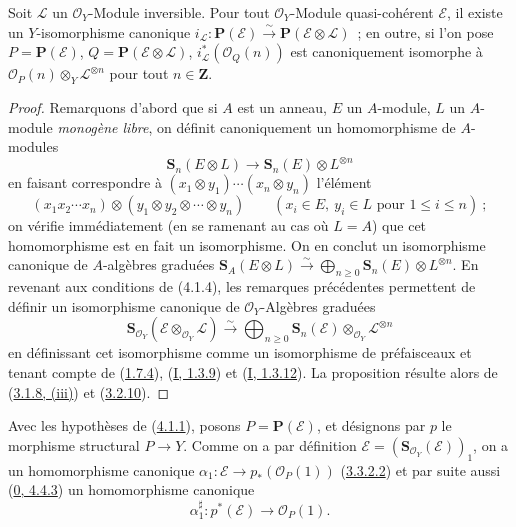 
\begin{proposition}[4.1.4]
\label{II.4.1.4-fr}
Soit $\mathcal{L}$ un $\mathcal{O}_Y$-Module inversible. Pour tout
$\mathcal{O}_Y$-Module quasi-cohérent $\mathcal{E}$, il existe un
$Y$-isomorphisme canonique
$i_{\mathcal{L}}:\mathbf{P}(\mathcal{E})\xrightarrow{\sim}
\mathbf{P}(\mathcal{E}\otimes\mathcal{L})$~; en outre, si l'on pose
$P=\mathbf{P}(\mathcal{E})$, $Q=\mathbf{P}(\mathcal{E}\otimes\mathcal{L})$,
$i_{\mathcal{L}}^*(\mathcal{O}_Q(n))$ est canoniquement isomorphe à
$\mathcal{O}_P(n)\otimes_Y\mathcal{L}^{\otimes n}$ pour tout
$n\in\mathbf{Z}$.
\end{proposition}

\begin{proof}
Remarquons d'abord que si $A$ est un anneau, $E$ un $A$-module, $L$ un
$A$-module \emph{monogène libre}, on définit canoniquement un homomorphisme
de $A$-modules
\[
  \mathbf{S}_n(E\otimes L)\longrightarrow
  \mathbf{S}_n(E)\otimes L^{\otimes n}
\]
en faisant correspondre à
$(x_1\otimes y_1)\cdots(x_n\otimes y_n)$ l'élément
\[
  (x_1x_2\cdots x_n)\otimes(y_1\otimes y_2\otimes\cdots\otimes y_n)
  \qquad(x_i\in E,\ y_i\in L\text{ pour }1\leq i\leq n)~;
\]
on vérifie immédiatement (en se ramenant au cas où $L=A$) que cet
homomorphisme est en fait un isomorphisme. On en conclut un isomorphisme
canonique de $A$-algèbres graduées
$\mathbf{S}_A(E\otimes L)\xrightarrow{\sim}
\bigoplus_{n\geq0}\mathbf{S}_n(E)\otimes L^{\otimes n}$. En revenant aux
conditions de (4.1.4), les remarques précédentes permettent de définir un
isomorphisme canonique de $\mathcal{O}_Y$-Algèbres graduées
\[
\label{II.4.1.4.1-fr}
  \mathbf{S}_{\mathcal{O}_Y}(\mathcal{E}\otimes_{\mathcal{O}_Y}\mathcal{L})
  \xrightarrow{\sim}
  \bigoplus_{n\geq0}\mathbf{S}_n(\mathcal{E})
  \otimes_{\mathcal{O}_Y}\mathcal{L}^{\otimes n}
\tag{4.1.4.1}
\]
en définissant cet isomorphisme comme un isomorphisme de préfaisceaux et
tenant compte de (\hyperref[II.1.7.4-fr]{1.7.4}),
(\hyperref[I.1.3.9-fr]{I, 1.3.9}) et
(\hyperref[I.1.3.12-fr]{I, 1.3.12}). La proposition résulte alors de
(\hyperref[II.3.1.8-fr]{3.1.8, (iii)}) et
(\hyperref[II.3.2.10-fr]{3.2.10}).
\end{proof}

\begin{env}[4.1.5]
\label{II.4.1.5-fr}
Avec les hypothèses de (\hyperref[II.4.1.1-fr]{4.1.1}), posons
$P=\mathbf{P}(\mathcal{E})$, et désignons par $p$ le morphisme structural
$P\to Y$. Comme on a par définition
$\mathcal{E}=(\mathbf{S}_{\mathcal{O}_Y}(\mathcal{E}))_1$, on a un
homomorphisme canonique
$\alpha_1:\mathcal{E}\to p_*(\mathcal{O}_P(1))$
(\hyperref[II.3.3.2.2-fr]{3.3.2.2}) et par suite aussi
(\hyperref[0.4.4.3-fr]{0, 4.4.3}) un homomorphisme canonique
\[
\label{II.4.1.5.1-fr}
  \alpha_1^\sharp:p^*(\mathcal{E})\longrightarrow\mathcal{O}_P(1).
\tag{4.1.5.1}
\]
\end{env}

